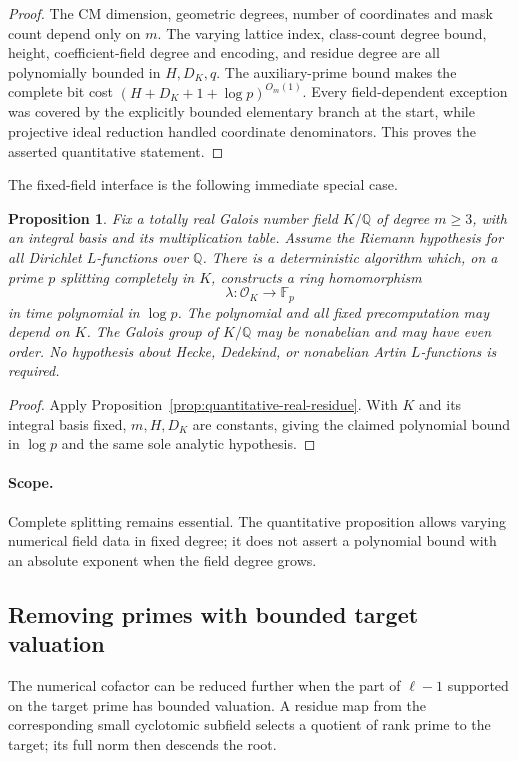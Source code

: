 \documentclass[11pt]{article}
\newtheorem{proposition}[theorem]{Proposition}
\theoremstyle{definition}
\theoremstyle{remark}
\begin{document}
\begin{proof}
The CM dimension, geometric degrees, number of coordinates and mask count
depend only on $m$.  The varying lattice index, class-count degree bound,
height, coefficient-field degree and encoding, and residue degree are all
polynomially bounded in $H,D_K,q$.  The auxiliary-prime bound makes the
complete bit cost $(H+D_K+1+\log p)^{O_m(1)}$.  Every field-dependent
exception was covered by the explicitly bounded elementary branch at the
start, while projective ideal reduction handled coordinate denominators.
This proves the asserted quantitative statement.

\end{proof}

The fixed-field interface is the following immediate special case.

\begin{proposition}\label{prop:fixed-real-residue}
Fix a totally real Galois number field $K/\mathbb Q$ of degree $m\geq3$,
with an integral basis and its multiplication table.  Assume the Riemann
hypothesis for all Dirichlet $L$-functions over $\mathbb Q$.  There is a
deterministic algorithm which, on a prime $p$ splitting completely in $K$,
constructs a ring homomorphism
\[
 \lambda:\mathcal O_K\longrightarrow\mathbb F_p
\]
in time polynomial in $\log p$.  The polynomial and all fixed precomputation
may depend on $K$.  The Galois group of $K/\mathbb Q$ may be nonabelian and
may have even order.  No hypothesis about Hecke, Dedekind, or nonabelian
Artin $L$-functions is required.
\end{proposition}
\begin{proof}
Apply Proposition~\ref{prop:quantitative-real-residue}.  With $K$ and its
integral basis fixed, $m,H,D_K$ are constants, giving the claimed polynomial
bound in $\log p$ and the same sole analytic hypothesis.
\end{proof}

\paragraph{Scope.}
Complete splitting remains essential.  The quantitative proposition allows
varying numerical field data in fixed degree; it does not assert a polynomial
bound with an absolute exponent when the field degree grows.



\subsection{Removing primes with bounded target valuation}
\label{sec:bounded-congruence-cofactor}
The numerical cofactor can be reduced further when the part of
$\ell-1$ supported on the target prime has bounded valuation.
A residue map from the corresponding small cyclotomic subfield selects a
quotient of rank prime to the target; its full norm then descends the root.
\end{document}
